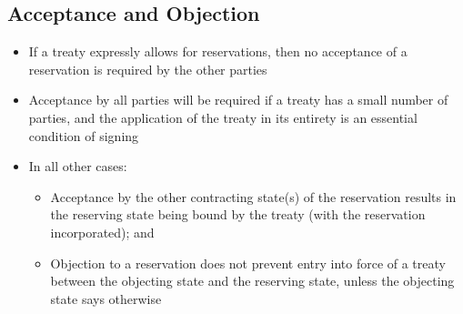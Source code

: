 \subsection{Acceptance and Objection}
\begin{itemize}
    \item If a treaty expressly allows for reservations, then no acceptance of a reservation is required by the other parties
    \item Acceptance by all parties will be required if a treaty has a small number of parties, and the application of the treaty in its entirety is an essential condition of signing 
    \item In all other cases:
    \begin{itemize}
        \item Acceptance by the other contracting state(s) of the reservation results in the reserving state being bound by the treaty (with the reservation incorporated); and
        \item Objection to a reservation does not prevent entry into force of a treaty between the objecting state and the reserving state, unless the objecting state says otherwise
    \end{itemize}
\end{itemize}
